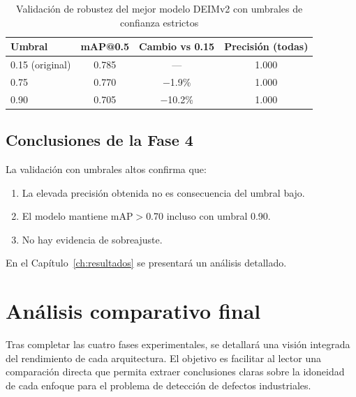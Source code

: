 \begin{table}[htbp]
\centering
\begin{tabular}{lccc}
\toprule
\textbf{Umbral} & \textbf{mAP@0.5} & \textbf{Cambio vs 0.15} & \textbf{Precisión (todas)} \\
\midrule
0.15 (original) & 0.785 & --- & 1.000 \\
0.75 & 0.770 & $-$1.9\% & 1.000 \\
0.90 & 0.705 & $-$10.2\% & 1.000 \\
\bottomrule
\end{tabular}
\caption{Validación de robustez del mejor modelo DEIMv2 con umbrales de confianza estrictos}
\label{tab:fase4_robustez}
\end{table}

\subsection{Conclusiones de la Fase 4}

La validación con umbrales altos confirma que:
\begin{enumerate}
    \item La elevada precisión obtenida no es consecuencia del umbral bajo.
    \item El modelo mantiene mAP$>$0.70 incluso con umbral 0.90.
    \item No hay evidencia de sobreajuste.
\end{enumerate}
 
En el Capítulo~\ref{ch:resultados} se presentará un análisis detallado.

\FloatBarrier
\section{Análisis comparativo final}
\label{sec:analisis_comparativo}

Tras completar las cuatro fases experimentales, se detallará una visión integrada del rendimiento de cada arquitectura. El objetivo es facilitar al lector una comparación directa que permita extraer conclusiones claras sobre la idoneidad de cada enfoque para el problema de detección de defectos industriales.



